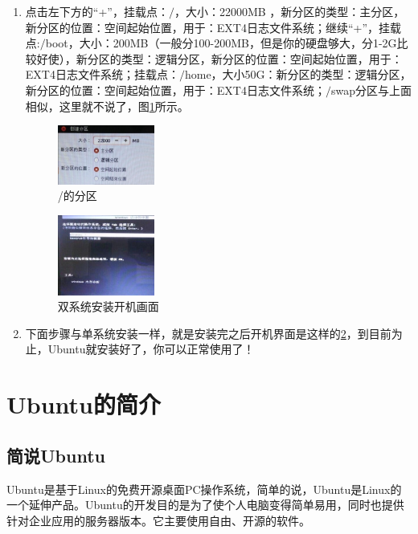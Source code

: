 \documentclass{article}
\begin{document}
\begin{enumerate}
\item 点击左下方的“+”，挂载点：$\slash$，大小：22000MB ，新分区的类型：主分区，新分区的位置：空间起始位置，用于：EXT4日志文件系统；继续“+”，挂载点:$\slash$boot，大小：200MB（一般分100-200MB，但是你的硬盘够大，分1-2G比较好使），新分区的类型：逻辑分区，新分区的位置：空间起始位置，用于：EXT4日志文件系统；挂载点：$\slash$home，大小50G：新分区的类型：逻辑分区，新分区的位置：空间起始位置，用于：EXT4日志文件系统；$\slash$swap分区与上面相似，这里就不说了，图\ref{tu24}所示。
\begin{figure}[!htb] %
\centering
\includegraphics[width=0.3\textwidth]{tu24.jpeg}
\caption{\small /的分区}
\label{tu24}
\end{figure} 
\begin{figure}[!htb] %
\centering
\includegraphics[width=0.3\textwidth]{tu25.jpeg}
\caption{\small 双系统安装开机画面}
\label{tu25}
\end{figure} 

\item 下面步骤与单系统安装一样，就是安装完之后开机界面是这样的\ref{tu25}，到目前为止，Ubuntu就安装好了，你可以正常使用了！
\end{enumerate}
\section{Ubuntu的简介}
\subsection{简说Ubuntu}
Ubuntu是基于Linux的免费开源桌面PC操作系统，简单的说，Ubuntu是Linux的一个延伸产品。Ubuntu的开发目的是为了使个人电脑变得简单易用，同时也提供针对企业应用的服务器版本。它主要使用自由、开源的软件。
\end{document}
